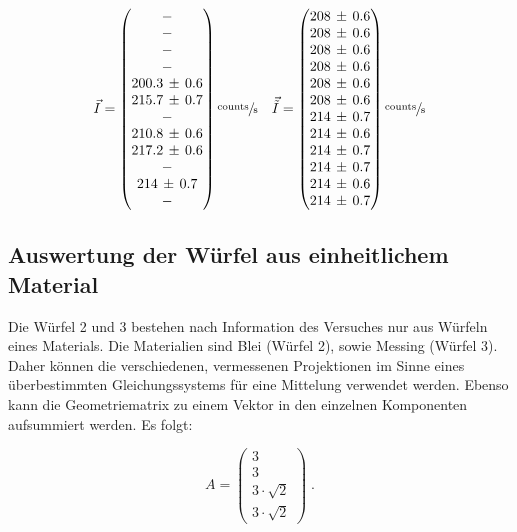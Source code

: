 \begin{equation}
	\vec{I}=
	\begin{pmatrix}
		- \\
		- \\
		- \\
		- \\
		200.3\,\pm\,0.6 \\
		215.7\,\pm\,0.7 \\
		- \\
		210.8\,\pm\,0.6 \\
		217.2\,\pm\,0.6 \\
		- \\
		214\,\pm\,0.7 \\
		-
	\end{pmatrix}
	\sfrac{\text{counts}}{\text{s}}\quad
	\vec{\tilde{I}}=
	\begin{pmatrix}
		208\,\pm\,0.6 \\
		208\,\pm\,0.6 \\
		208\,\pm\,0.6 \\
		208\,\pm\,0.6 \\
		208\,\pm\,0.6 \\
		208\,\pm\,0.6 \\
		214\,\pm\,0.7 \\
		214\,\pm\,0.6 \\
		214\,\pm\,0.7 \\
		214\,\pm\,0.7 \\
		214\,\pm\,0.6 \\
		214\,\pm\,0.7
	\end{pmatrix}
    \sfrac{\text{counts}}{\text{s}}
	\label{eq:int}
\end{equation}

\subsection{Auswertung der Würfel aus einheitlichem Material}

Die Würfel 2 und 3 bestehen nach Information des Versuches nur aus Würfeln 
eines Materials. Die Materialien sind Blei (Würfel 2), sowie Messing (Würfel 
3). Daher können die verschiedenen, vermessenen Projektionen im Sinne eines 
überbestimmten Gleichungssystems für eine Mittelung verwendet werden. Ebenso 
kann die Geometriematrix zu einem Vektor in den einzelnen Komponenten 
aufsummiert werden. Es folgt:

\begin{equation}
	A=
	\begin{pmatrix}
		3 \\
		3 \\
		3\cdot\sqrt{2} \\
		3\cdot\sqrt{2}
	\end{pmatrix} \; .
\end{equation}

